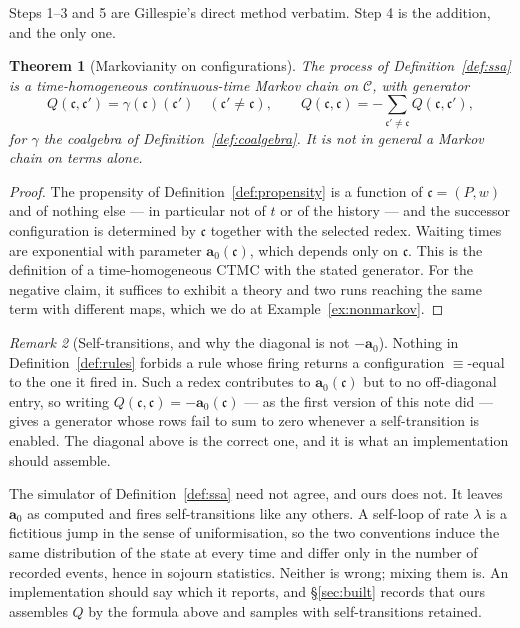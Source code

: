 \documentclass[11pt,a4paper]{article}
\theoremstyle{plain}
\newtheorem{theorem}{Theorem}
\theoremstyle{definition}
\theoremstyle{remark}
\newtheorem{remark}[theorem]{Remark}
\newcommand{\Cfg}{\mathcal{C}}
\newcommand{\prop}{\mathbf{a}}
\newcommand{\wmap}{w}
\begin{document}
Steps 1--3 and 5 are Gillespie's direct method \cite{gillespie77} verbatim. Step 4 is the addition,
and the only one.

\begin{theorem}[Markovianity on configurations]
\label{thm:markov}
The process of Definition~\ref{def:ssa} is a time-homogeneous continuous-time Markov chain on
$\Cfg$, with generator
\[
Q(\mathfrak{c}, \mathfrak{c}')
= \gamma(\mathfrak{c})(\mathfrak{c}')
\quad (\mathfrak{c}' \neq \mathfrak{c}),
\qquad
Q(\mathfrak{c},\mathfrak{c}) = -\!\!\sum_{\mathfrak{c}' \neq \mathfrak{c}}\!\! Q(\mathfrak{c},\mathfrak{c}'),
\]
for $\gamma$ the coalgebra of Definition~\ref{def:coalgebra}. It is \emph{not} in general a Markov
chain on terms alone.
\end{theorem}

\begin{proof}
The propensity of Definition~\ref{def:propensity} is a function of $\mathfrak{c} = (P,\wmap)$ and of
nothing else --- in particular not of $t$ or of the history --- and the successor configuration is
determined by $\mathfrak{c}$ together with the selected redex. Waiting times are exponential with
parameter $\prop_0(\mathfrak{c})$, which depends only on $\mathfrak{c}$. This is the definition of a
time-homogeneous CTMC with the stated generator. For the negative claim, it suffices to exhibit a
theory and two runs reaching the same term with different maps, which we do at
Example~\ref{ex:nonmarkov}.
\end{proof}

\begin{remark}[Self-transitions, and why the diagonal is not $-\prop_0$]
\label{rem:selfloop}
Nothing in Definition~\ref{def:rules} forbids a rule whose firing returns a configuration
$\equiv$-equal to the one it fired in. Such a redex contributes to $\prop_0(\mathfrak{c})$ but to no
off-diagonal entry, so writing $Q(\mathfrak{c},\mathfrak{c}) = -\prop_0(\mathfrak{c})$ --- as the
first version of this note did --- gives a generator whose rows fail to sum to zero whenever a
self-transition is enabled. The diagonal above is the correct one, and it is what an implementation
should assemble.

The simulator of Definition~\ref{def:ssa} need not agree, and ours does not. It leaves $\prop_0$ as
computed and fires self-transitions like any others. A self-loop of rate $\lambda$ is a fictitious
jump in the sense of uniformisation, so the two conventions induce the same distribution of the state
at every time and differ only in the number of recorded events, hence in sojourn statistics. Neither
is wrong; mixing them is. An implementation should say which it reports, and \S\ref{sec:built}
records that ours assembles $Q$ by the formula above and samples with self-transitions retained.
\end{remark}
\end{document}
